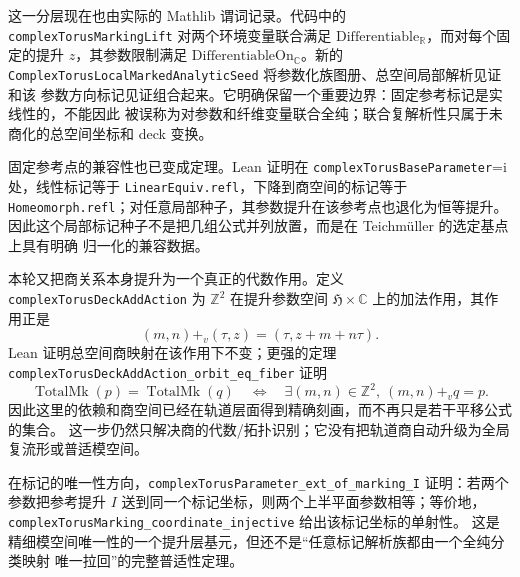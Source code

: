 \documentclass[UTF8,fontset=none,a4paper,11pt]{ctexart}
\begin{document}
这一分层现在也由实际的 Mathlib 谓词记录。代码中的
\texttt{complexTorusMarkingLift} 对两个环境变量联合满足
\(\mathrm{Differentiable}_{\mathbb R}\)，而对每个固定的提升 \(z\)，其参数限制满足
\(\mathrm{DifferentiableOn}_{\mathbb C}\)。新的
\texttt{ComplexTorusLocalMarkedAnalyticSeed} 将参数化族图册、总空间局部解析见证和该
参数方向标记见证组合起来。它明确保留一个重要边界：固定参考标记是实线性的，不能因此
被误称为对参数和纤维变量联合全纯；联合复解析性只属于未商化的总空间坐标和 deck 变换。

固定参考点的兼容性也已变成定理。Lean 证明在
\texttt{complexTorusBaseParameter}=i 处，线性标记等于
\texttt{LinearEquiv.refl}，下降到商空间的标记等于
\texttt{Homeomorph.refl}；对任意局部种子，其参数提升在该参考点也退化为恒等提升。
因此这个局部标记种子不是把几组公式并列放置，而是在 Teichmüller 的选定基点上具有明确
归一化的兼容数据。

本轮又把商关系本身提升为一个真正的代数作用。定义
\texttt{complexTorusDeckAddAction} 为 \(\mathbb Z^2\) 在提升参数空间
\(\mathfrak H\times\mathbb C\) 上的加法作用，其作用正是
\[
  (m,n)\mathbin{+_v}(\tau,z)=(\tau,z+m+n\tau).
\]
Lean 证明总空间商映射在该作用下不变；更强的定理
\texttt{complexTorusDeckAddAction\allowbreak\_orbit\allowbreak\_eq\allowbreak\_fiber} 证明
\[
  \operatorname{TotalMk}(p)=\operatorname{TotalMk}(q)
  \quad\Longleftrightarrow\quad
  \exists (m,n)\in\mathbb Z^2,\ (m,n)\mathbin{+_v}q=p.
\]
因此这里的依赖和商空间已经在轨道层面得到精确刻画，而不再只是若干平移公式的集合。
这一步仍然只解决商的代数/拓扑识别；它没有把轨道商自动升级为全局复流形或普适模空间。

在标记的唯一性方向，\texttt{complexTorusParameter\allowbreak\_ext\allowbreak\_of\allowbreak\_marking\allowbreak\_I} 证明：若两个
参数把参考提升 \(I\) 送到同一个标记坐标，则两个上半平面参数相等；等价地，
\texttt{complexTorusMarking\allowbreak\_coordinate\allowbreak\_injective} 给出该标记坐标的单射性。
这是精细模空间唯一性的一个提升层基元，但还不是“任意标记解析族都由一个全纯分类映射
唯一拉回”的完整普适性定理。
\end{document}
